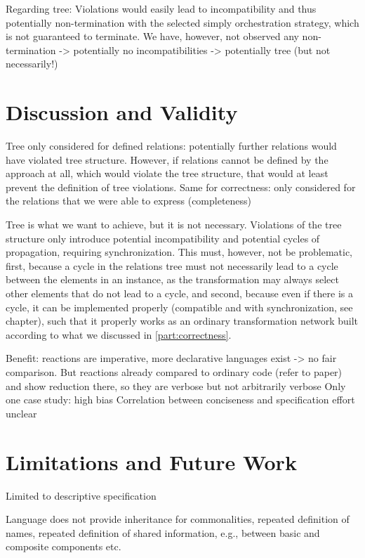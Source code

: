 Regarding tree: Violations would easily lead to incompatibility and thus potentially non-termination with the selected simply orchestration strategy, which is not guaranteed to terminate. We have, however, not observed any non-termination -> potentially no incompatibilities -> potentially tree (but not necessarily!)

\section{Discussion and Validity}

Tree only considered for defined relations: potentially further relations would have violated tree structure. However, if relations cannot be defined by the approach at all, which would violate the tree structure, that would at least prevent the definition of tree violations.
Same for correctness: only considered for the relations that we were able to express (completeness)

Tree is what we want to achieve, but it is not necessary. Violations of the tree structure only introduce potential incompatibility and potential cycles of propagation, requiring synchronization. This must, however, not be problematic, first, because a cycle in the relations tree must not necessarily lead to a cycle between the elements in an instance, as the transformation may always select other elements that do not lead to a cycle, and second, because even if there is a cycle, it can be implemented properly (compatible and with synchronization, see chapter), such that it properly works as an ordinary transformation network built according to what we discussed in \autoref{part:correctness}.

Benefit: reactions are imperative, more declarative languages exist -> no fair comparison. But reactions already compared to ordinary code (refer to paper) and show reduction there, so they are verbose but not arbitrarily verbose
Only one case study: high bias
Correlation between conciseness and specification effort unclear


\section{Limitations and Future Work}
Limited to descriptive specification

Language does not provide inheritance for commonalities, repeated definition of names, repeated definition of shared information, e.g., between basic and composite components etc.

